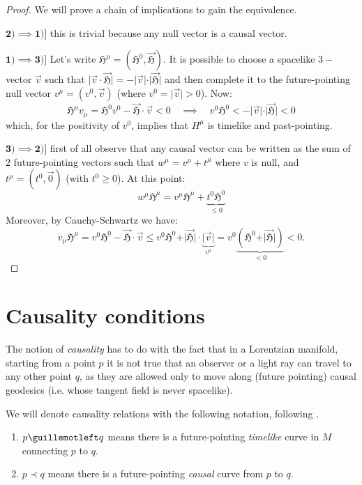 \begin{proof}
	We will prove a chain of implications to gain the equivalence.
	
	\(\mathbf{2) \implies 1)]}\) this is trivial because any null vector is a causal vector.
	
	\(\mathbf{1) \implies 3)]}\) Let's write \(\mathfrak{H}^{\mu} = (\mathfrak{H}^0, \vec{\mathfrak{H}})\). It is possible to choose a spacelike \(3-\)vector \(\vec{v}\) such that \(\vert\vec{v}\cdot\vec{\mathfrak{H}}\vert = - \vert\vec{v}\vert\cdot\vert\vec{\mathfrak{H}}\vert\) and  then complete it to the future-pointing null vector \(v^{\mu} = (v^0, \vec{v})\) (where \(v^0 = \vert \vec{v}\vert > 0\)).
	Now:
	\[
	\mathfrak{H}^{\mu}v_{\mu} = \mathfrak{H}^0v^0 - \vec{\mathfrak{H}}\cdot\vec{v} < 0 \quad \implies 
	\quad v^0 \mathfrak{H}^0 < - \vert\vec{v}\vert\cdot\vert\vec{\mathfrak{H}}\vert < 0
	\]
	which, for the positivity of \(v^0\), implies that \(H^{\mu}\) is timelike and past-pointing.
	
	\(\mathbf{3) \implies 2)]}\) first of all observe that any causal vector can be written as the sum of \(2\) future-pointing vectors such that \(w^{\mu}= v^{\mu} + t^{\mu}\) where \(v\) is null, and \(t^{\mu} = (t^0, \vec{0})\) (with \(t^0 \ge 0\)). At this point:
	\[
	w^{\mu}\mathfrak{H}^{\mu} = v^{\mu}\mathfrak{H}^{\mu} + \underbrace{t^0 \mathfrak{H}^0}_{\le0}
	\]
	Moreover, by Cauchy-Schwartz we have:
	\[
	v_{\mu}\mathfrak{H}^{\mu} = v^0 \mathfrak{H}^0 - \vec{\mathfrak{H}}\cdot\vec{v} \le v^0\mathfrak{H}^0 +\vert \vec{\mathfrak{H}}\vert\cdot\underbrace{\vert\vec{v}\vert}_{v^0} = v^0\underbrace{(\mathfrak{H}^0 + \vert \vec{\mathfrak{H}}\vert)}_{<0} < 0.
	\]
\end{proof}

\section{Causality conditions}

The notion of \emph{causality} has to do with the fact that in a Lorentzian manifold, starting from a  point \(p\) it is not true that an observer or a light ray can travel to any other point \(q\), as they are allowed only to move along (future pointing) causal geodesics (i.e. whose tangent field is never spacelike).


We will denote causality relations with the following notation, following \cite{o1983semi}.
\begin{enumerate}
	\item  \(p \guillemotleft q\) means there is a future-pointing \emph{timelike} curve in \(M\) connecting \(p\) to \(q\).
	\item \(p \prec q\) means there is a future-pointing \emph{causal} curve from \(p\) to \(q\).
\end{enumerate}

